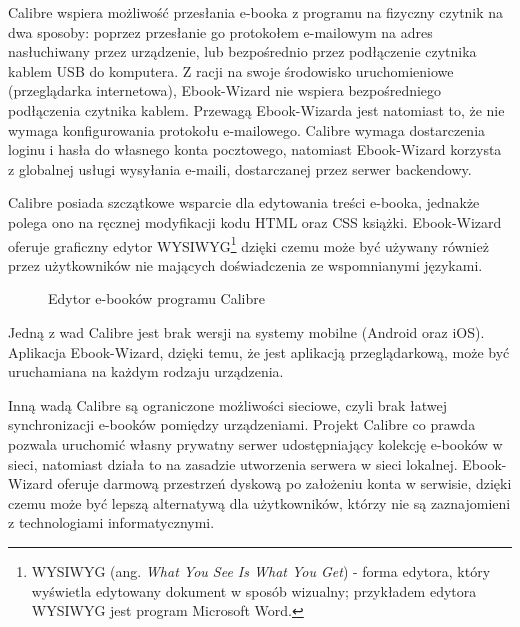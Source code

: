 Calibre wspiera możliwość przesłania e-booka z programu na fizyczny czytnik na dwa sposoby: poprzez przesłanie go protokołem e-mailowym na adres nasłuchiwany przez urządzenie, lub bezpośrednio przez podłączenie czytnika kablem USB do komputera. Z racji na swoje środowisko uruchomieniowe (przeglądarka internetowa), Ebook-Wizard nie wspiera bezpośredniego podłączenia czytnika kablem. Przewagą Ebook-Wizarda jest natomiast to, że nie wymaga konfigurowania protokołu e-mailowego. Calibre wymaga dostarczenia loginu i hasła do własnego konta pocztowego, natomiast Ebook-Wizard korzysta z globalnej usługi wysyłania e-maili, dostarczanej przez serwer backendowy.

Calibre posiada szczątkowe wsparcie dla edytowania treści e-booka, jednakże polega ono na ręcznej modyfikacji kodu HTML oraz CSS książki. Ebook-Wizard oferuje graficzny edytor WYSIWYG\footnote{WYSIWYG (ang. \textit{What You See Is What You Get}) - forma edytora, który wyświetla edytowany dokument w sposób wizualny; przykładem edytora WYSIWYG jest program Microsoft Word.} dzięki czemu może być używany również przez użytkowników nie mających doświadczenia ze wspomnianymi językami.

\begin{figure}[h]
    \centering
    \setlength{\fboxsep}{0pt}
    \setlength{\fboxrule}{0.4pt}
    \caption{Edytor e-booków programu Calibre}
    \label{fig:obrazek_z_ramką}
\end{figure}

Jedną z wad Calibre jest brak wersji na systemy mobilne (Android oraz iOS). Aplikacja Ebook-Wizard, dzięki temu, że jest aplikacją przeglądarkową, może być uruchamiana na każdym rodzaju urządzenia.

Inną wadą Calibre są ograniczone możliwości sieciowe, czyli brak łatwej synchronizacji e-booków pomiędzy urządzeniami. Projekt Calibre co prawda pozwala uruchomić własny prywatny serwer udostępniający kolekcję e-booków w sieci, natomiast działa to na zasadzie utworzenia serwera w sieci lokalnej. Ebook-Wizard oferuje darmową przestrzeń dyskową po założeniu konta w serwisie, dzięki czemu może być lepszą alternatywą dla użytkowników, którzy nie są zaznajomieni z technologiami informatycznymi.


